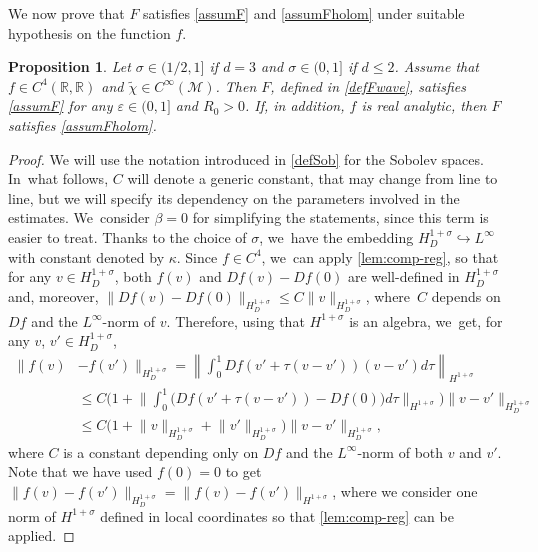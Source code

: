 \documentclass[10pt]{amsart}
\newtheorem{proposition}[theorem]{Proposition}
\theoremstyle{definition}
\let\mc\mathcal
\let\veps\varepsilon
\newcommand{\M}{\mc{M}}
\newcommand{\R}{\mathbb{R}}
\providecommand{\norm}[1]{\lVert#1\rVert}
\newcommand{\Norm}[1]{\left\lVert#1\right\rVert}
\begin{document}
We now prove that $F$ satisfies \cref{assumF} and \ref{assumFholom} under suitable hypothesis on the function $f$.

\begin{proposition}\label{prop:f-assumptions}
Let $\sigma\in (1/2, 1]$ if $d=3$ and $\sigma\in (0,1]$ if $d\leq 2$. Assume that $f\in C^4(\R,\R)$ and $\widetilde{\chi}\in C^{\infty}(\M)$. Then $F$, defined in \eqref{defFwave}, satisfies \cref{assumF} for any $\veps\in (0, 1]$ and $R_0>0$. If, in addition, $f$ is real analytic, then $F$ satisfies \cref{assumFholom}.
\end{proposition}
\begin{proof} We will use the notation introduced in \eqref{defSob} for the Sobolev spaces. In~what follows, $C$ will denote a generic constant, that may change from line to line, but we will specify its dependency on the parameters involved in the estimates. We~consider $\beta=0$ for simplifying the statements, since this term is easier to treat. Thanks to the choice of $\sigma$, we~have the embedding $H_D^{1+\sigma}\hookrightarrow L^\infty$ with constant denoted by $\kappa$. Since $f\in C^4$, we~can apply \cref{lem:comp-reg}, so that for any $v\in H_D^{1+\sigma}$, both $f(v)$ and $Df(v)-Df(0)$ are well-defined in $H_D^{1+\sigma}$ and, moreover, $\norm{Df(v)-Df(0)}_{H_D^{1+\sigma}}\leq C\norm{v}_{H_D^{1+\sigma}}$, where~$C$ depends on $Df$ and the $L^{\infty}$-norm of $v$. Therefore, using that $H^{1+\sigma}$ is an algebra, we~get, for any $v$, $v'\in H_D^{1+\sigma}$,
\begin{equation}\label{fineq1}
\begin{aligned}
\norm{f(v)&-f(v')}_{H_D^{1+\sigma}}=\Norm{\int_0^1 Df(v'+\tau(v-v'))(v-v')d\tau}_{H^{1+\sigma}}\\
&\leq C\biggl(1+\biggl\|\int_0^1 \big(Df(v'+\tau(v-v'))-Df(0)\big)d\tau\biggr\|_{H^{1+\sigma}}\biggr)\norm{v-v'}_{H_D^{1+\sigma}}\\
&\leq C\bigl(1+\norm{v}_{H_D^{1+\sigma}}+\norm{v'}_{H_D^{1+\sigma}}\bigr)\norm{v-v'}_{H_D^{1+\sigma}},
\end{aligned}
\end{equation}
where $C$ is a constant depending only on $Df$ and the $L^\infty$-norm of both $v$ and $v'$. Note that we have used $f(0)=0$ to get $\norm{f(v)-f(v')}_{H_D^{1+\sigma}}=\norm{f(v)-f(v')}_{H^{1+\sigma}}$, where we consider one norm of $H^{1+\sigma}$ defined in local coordinates so that \cref{lem:comp-reg} can be applied.


\end{proof}
\end{document}
